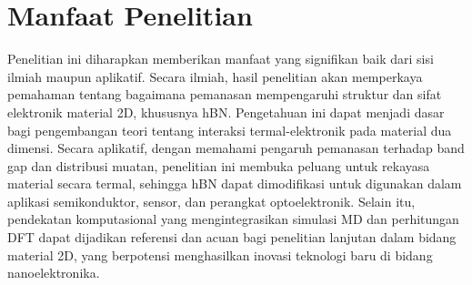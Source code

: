 \section{Manfaat Penelitian}
Penelitian ini diharapkan memberikan manfaat yang signifikan baik dari sisi ilmiah maupun aplikatif. Secara ilmiah, hasil penelitian akan memperkaya pemahaman tentang bagaimana pemanasan mempengaruhi struktur dan sifat elektronik material 2D, khususnya hBN. Pengetahuan ini dapat menjadi dasar bagi pengembangan teori tentang interaksi termal-elektronik pada material dua dimensi. Secara aplikatif, dengan memahami pengaruh pemanasan terhadap band gap dan distribusi muatan, penelitian ini membuka peluang untuk rekayasa material secara termal, sehingga hBN dapat dimodifikasi untuk digunakan dalam aplikasi semikonduktor, sensor, dan perangkat optoelektronik. Selain itu, pendekatan komputasional yang mengintegrasikan simulasi MD dan perhitungan DFT dapat dijadikan referensi dan acuan bagi penelitian lanjutan dalam bidang material 2D, yang berpotensi menghasilkan inovasi teknologi baru di bidang nanoelektronika.